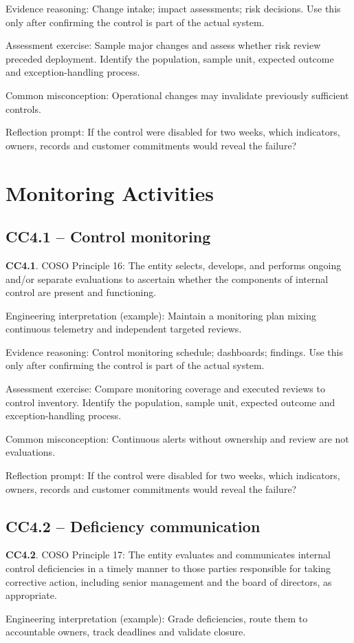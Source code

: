 \documentclass[10pt,oneside]{report}
\begin{document}
Evidence reasoning: Change intake; impact assessments; risk decisions. Use this only after confirming the control is part of the actual system.

Assessment exercise: Sample major changes and assess whether risk review preceded deployment. Identify the population, sample unit, expected outcome and exception-handling process.

Common misconception: Operational changes may invalidate previously sufficient controls.

Reflection prompt: If the control were disabled for two weeks, which indicators, owners, records and customer commitments would reveal the failure?

\section{Monitoring Activities}
\subsection{CC4.1 -- Control monitoring}
\begin{aicpabox}
\textbf{CC4.1}. COSO Principle 16: The entity selects, develops, and performs ongoing and/or separate evaluations to ascertain whether the components of internal control are present and functioning.\par{}
\end{aicpabox}
Engineering interpretation (example): Maintain a monitoring plan mixing continuous telemetry and independent targeted reviews.

Evidence reasoning: Control monitoring schedule; dashboards; findings. Use this only after confirming the control is part of the actual system.

Assessment exercise: Compare monitoring coverage and executed reviews to control inventory. Identify the population, sample unit, expected outcome and exception-handling process.

Common misconception: Continuous alerts without ownership and review are not evaluations.

Reflection prompt: If the control were disabled for two weeks, which indicators, owners, records and customer commitments would reveal the failure?

\subsection{CC4.2 -- Deficiency communication}
\begin{aicpabox}
\textbf{CC4.2}. COSO Principle 17: The entity evaluates and communicates internal control deficiencies in a timely manner to those parties responsible for taking corrective action, including senior management and the board of directors, as appropriate.\par{}
\end{aicpabox}
Engineering interpretation (example): Grade deficiencies, route them to accountable owners, track deadlines and validate closure.
\end{document}
